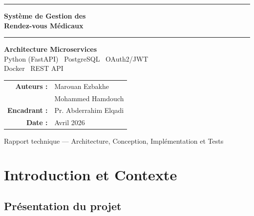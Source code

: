 \documentclass[12pt,a4paper]{article}
\begin{document}
\begin{titlepage}
  \centering
  \vspace*{1.5cm}

  {\color{primaryblue}\rule{\linewidth}{1.5pt}}
  \vspace{0.4cm}

  {\Huge\bfseries\color{primaryblue}
    Système de Gestion des\\[0.3cm]
    Rendez-vous Médicaux
  }

  \vspace{0.4cm}
  {\color{primaryblue}\rule{\linewidth}{1.5pt}}

  \vspace{1cm}

  \begin{tcolorbox}[
    colback=accentblue!10,
    colframe=accentblue,
    width=0.85\textwidth,
    center,
    fontupper=\large\centering
  ]
    \textbf{Architecture Microservices} \\[4pt]
    Python (FastAPI) \textbullet\ PostgreSQL \textbullet\ OAuth2/JWT \\
    Docker \textbullet\ REST API
  \end{tcolorbox}

  \vspace{2cm}

  \begin{tabular}{rl}
    \textbf{Auteurs :}    & Marouan Ezbakhe \\[2pt]
                          & Mohammed Hamdouch \\[4pt]
    \textbf{Encadrant :} & Pr. Abderrahim Elqadi \\[4pt]
    \textbf{Date :}       & Avril 2026 \\[4pt]
  \end{tabular}

  \vfill

  {\small\color{darkgray}
    Rapport technique — Architecture, Conception, Implémentation et Tests
  }
\end{titlepage}

\newpage
\tableofcontents
\newpage

\section{Introduction et Contexte}

\subsection{Présentation du projet}
\end{document}
